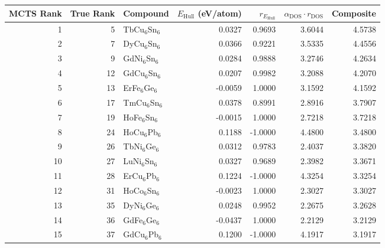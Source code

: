 \begin{tabular}{rrlrrrr}
\toprule
MCTS Rank & True Rank & Compound & $E_{\mathrm{Hull}}$ (eV/atom) & $r_{E_{\mathrm{Hull}}}$ & $\alpha_{\mathrm{DOS}} \cdot r_{\mathrm{DOS}}$ & Composite \\
\midrule
1 & 5 & TbCu$_{6}$Sn$_{6}$ & 0.0327 & 0.9693 & 3.6044 & 4.5738 \\
2 & 7 & DyCu$_{6}$Sn$_{6}$ & 0.0366 & 0.9221 & 3.5335 & 4.4556 \\
3 & 9 & GdNi$_{6}$Sn$_{6}$ & 0.0284 & 0.9888 & 3.2746 & 4.2634 \\
4 & 12 & GdCu$_{6}$Sn$_{6}$ & 0.0207 & 0.9982 & 3.2088 & 4.2070 \\
5 & 13 & ErFe$_{6}$Ge$_{6}$ & -0.0059 & 1.0000 & 3.1592 & 4.1592 \\
6 & 17 & TmCu$_{6}$Sn$_{6}$ & 0.0378 & 0.8991 & 2.8916 & 3.7907 \\
7 & 19 & HoFe$_{6}$Sn$_{6}$ & -0.0015 & 1.0000 & 2.7218 & 3.7218 \\
8 & 24 & HoCu$_{6}$Pb$_{6}$ & 0.1188 & -1.0000 & 4.4800 & 3.4800 \\
9 & 26 & TbNi$_{6}$Ge$_{6}$ & 0.0312 & 0.9783 & 2.4037 & 3.3820 \\
10 & 27 & LuNi$_{6}$Sn$_{6}$ & 0.0327 & 0.9689 & 2.3982 & 3.3671 \\
11 & 28 & ErCu$_{6}$Pb$_{6}$ & 0.1224 & -1.0000 & 4.3254 & 3.3254 \\
12 & 31 & HoCo$_{6}$Sn$_{6}$ & -0.0023 & 1.0000 & 2.3027 & 3.3027 \\
13 & 35 & DyNi$_{6}$Ge$_{6}$ & 0.0248 & 0.9952 & 2.2675 & 3.2628 \\
14 & 36 & GdFe$_{6}$Ge$_{6}$ & -0.0437 & 1.0000 & 2.2129 & 3.2129 \\
15 & 37 & GdCu$_{6}$Pb$_{6}$ & 0.1200 & -1.0000 & 4.1917 & 3.1917 \\
\bottomrule
\end{tabular}
